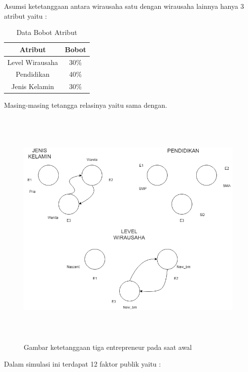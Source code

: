 Asumsi ketetanggaan antara wirausaha satu dengan wirausaha lainnya hanya 3 atribut yaitu :

\begin{table} [H]
\centering
\caption{Data Bobot Atribut}
\begin{tabular}{|c|c|}
\hline
Atribut & Bobot\\
\hline
Level Wirausaha & 30\% \\
\hline
Pendidikan & 40\% \\
\hline
Jenis Kelamin & 30\% \\
\hline
\end{tabular}
\end{table}

Masing-masing tetangga relasinya yaitu sama dengan.

	\begin{figure} [H]
		\centering  
		\includegraphics[width=16cm, height=12cm]{t=0} 
		\caption[Gambar ketetanggaan tiga entrepreneur pada saat awal]{Gambar ketetanggaan tiga entrepreneur pada saat awal} 
		\label{fig:t0} 
	\end{figure}


Dalam simulasi ini terdapat 12 faktor publik yaitu :

